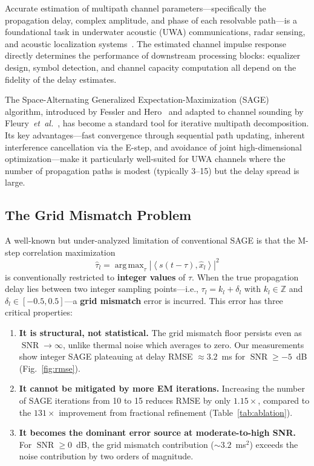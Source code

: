 \documentclass[a4paper,fleqn]{cas-dc}
\DeclareMathOperator*{\argmax}{arg\,max}
\DeclareMathOperator{\SNR}{SNR}
\newcommand{\Zz}{\mathbb{Z}}
\newcommand{\abs}[1]{\left| #1 \right|}
\newcommand{\inner}[2]{\left\langle #1, #2 \right\rangle}
\newcommand{\hb}[1]{\hat{#1}}
\begin{document}
Accurate estimation of multipath channel parameters---specifically the propagation delay, complex amplitude, and phase of each resolvable path---is a foundational task in underwater acoustic (UWA) communications, radar sensing, and acoustic localization systems~\cite{stojanovic2009,eggen2001}. The estimated channel impulse response directly determines the performance of downstream processing blocks: equalizer design, symbol detection, and channel capacity computation all depend on the fidelity of the delay estimates.

The Space-Alternating Generalized Expectation-Maximization (SAGE) algorithm, introduced by Fessler and Hero~\cite{fessler1994} and adapted to channel sounding by Fleury~\textit{et~al.}~\cite{fleury1999}, has become a standard tool for iterative multipath decomposition. Its key advantages---fast convergence through sequential path updating, inherent interference cancellation via the E-step, and avoidance of joint high-dimensional optimization---make it particularly well-suited for UWA channels where the number of propagation paths is modest (typically 3--15) but the delay spread is large.

\subsection{The Grid Mismatch Problem}

A well-known but under-analyzed limitation of conventional SAGE is that the M-step correlation maximization
\begin{equation}
\hb{\tau}_l = \argmax_{\tau} \abs{\inner{s(t-\tau)}{\hb{x}_l}}^2
\label{eq:mstep}
\end{equation}
is conventionally restricted to \textbf{integer values} of $\tau$. When the true propagation delay lies between two integer sampling points---i.e., $\tau_l = k_l + \delta_l$ with $k_l \in \Zz$ and $\delta_l \in [-0.5, 0.5]$---a \textbf{grid mismatch} error is incurred. This error has three critical properties:

\begin{enumerate}
\item \textbf{It is structural, not statistical.} The grid mismatch floor persists even as $\SNR \to \infty$, unlike thermal noise which averages to zero. Our measurements show integer SAGE plateauing at delay RMSE $\approx 3.2$~ms for $\SNR \ge -5$~dB (Fig.~\ref{fig:rmse}).

\item \textbf{It cannot be mitigated by more EM iterations.} Increasing the number of SAGE iterations from 10 to 15 reduces RMSE by only $1.15\times$, compared to the $131\times$ improvement from fractional refinement (Table~\ref{tab:ablation}).

\item \textbf{It becomes the dominant error source at moderate-to-high SNR.} For $\SNR \ge 0$~dB, the grid mismatch contribution ($\sim 3.2$~ms$^2$) exceeds the noise contribution by two orders of magnitude.
\end{enumerate}
\end{document}
